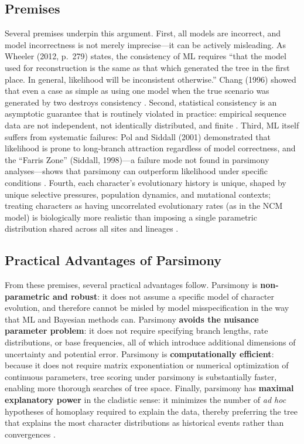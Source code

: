 \subsection{Premises}

Several premises underpin this argument. First, all models are incorrect, and model incorrectness is not merely imprecise---it can be actively misleading. As Wheeler (2012, p.~279) states, the consistency of ML requires ``that the model used for reconstruction is the same as that which generated the tree in the first place. In general, likelihood will be inconsistent otherwise.'' Chang (1996) showed that even a case as simple as using one model when the true scenario was generated by two destroys consistency \parencite{chang1996}. Second, statistical consistency is an asymptotic guarantee that is routinely violated in practice: empirical sequence data are not independent, not identically distributed, and finite \parencite{wheeler2012}. Third, ML itself suffers from systematic failures: Pol and Siddall (2001) demonstrated that likelihood is prone to long-branch attraction regardless of model correctness, and the ``Farris Zone'' (Siddall, 1998)---a failure mode not found in parsimony analyses---shows that parsimony can outperform likelihood under specific conditions \parencite{pol2001,siddall1998}. Fourth, each character's evolutionary history is unique, shaped by unique selective pressures, population dynamics, and mutational contexts; treating characters as having uncorrelated evolutionary rates (as in the NCM model) is biologically more realistic than imposing a single parametric distribution shared across all sites and lineages \parencite{tuffley1997}.

\subsection{Practical Advantages of Parsimony}

From these premises, several practical advantages follow. Parsimony is \textbf{non-parametric and robust}: it does not assume a specific model of character evolution, and therefore cannot be misled by model misspecification in the way that ML and Bayesian methods can. Parsimony \textbf{avoids the nuisance parameter problem}: it does not require specifying branch lengths, rate distributions, or base frequencies, all of which introduce additional dimensions of uncertainty and potential error. Parsimony is \textbf{computationally efficient}: because it does not require matrix exponentiation or numerical optimization of continuous parameters, tree scoring under parsimony is substantially faster, enabling more thorough searches of tree space. Finally, parsimony has \textbf{maximal explanatory power} in the cladistic sense: it minimizes the number of \textit{ad hoc} hypotheses of homoplasy required to explain the data, thereby preferring the tree that explains the most character distributions as historical events rather than convergences \parencite{farris1983}.

